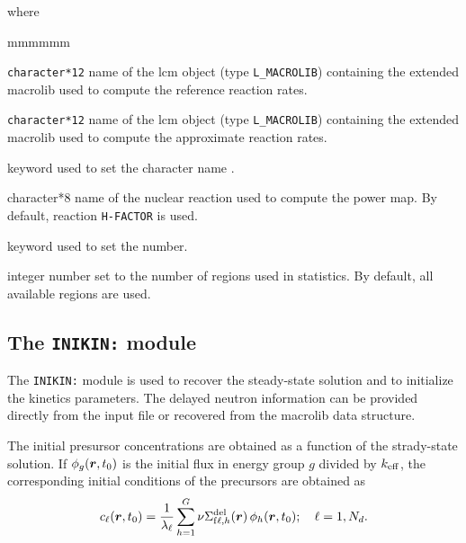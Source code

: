 \noindent where
\begin{ListeDeDescription}{mmmmmm}

\item[\dusa{MACRO1}] {\tt character*12} name of the {\sc lcm} object (type {\tt L\_MACROLIB}) containing the extended {\sc macrolib} used to compute the reference reaction rates.

\item[\dusa{MACRO2}] {\tt character*12} name of the {\sc lcm} object (type {\tt L\_MACROLIB}) containing the extended {\sc macrolib} used to compute the approximate reaction rates.

\item[\moc{HREA}] keyword used to set the character name .

\item[\dusa{hname}] character*8 name of the nuclear reaction used to compute the power map. By default, reaction {\tt H-FACTOR} is used.

\item[\moc{NREG}] keyword used to set the  number.

\item[\dusa{nreg}] integer number set to the number of regions used in statistics. By default, all available regions are used.

\end{ListeDeDescription}
\clearpage

\subsection{The {\tt INIKIN:} module}\label{sect:inikin}

The {\tt INIKIN:} module is used  to recover the steady-state solution and to initialize the kinetics parameters.
The delayed neutron information can be provided directly from the input file or recovered from the {\sc macrolib}
data structure.

The initial presursor concentrations are obtained as a function of the strady-state solution. If $\phi_g(\bff(r),t_0)$ is
the initial flux in energy group $g$ divided by $k_{\rm eff}$, the corresponding initial conditions of the precursors are obtained as
\begin{equation}
c_{\ell}(\bff(r),t_0)={1 \over \lambda_\ell} \sum_{h=1}^G \nu\Sigma_{{\rm f}\ell,h}^{\rm del}(\bff(r)) \, \phi_h(\bff(r),t_0) ; \ \ \ \ell=1,N_d .
\label{eq:eq_inikin_1}
\end{equation}

